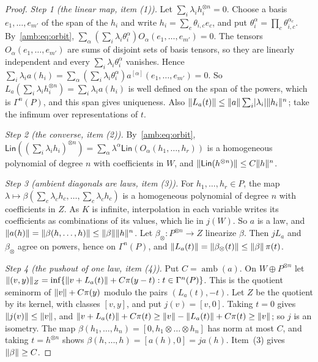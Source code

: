 \begin{proof}
\emph{Step 1 (the linear map, item (1)).} Let $\sum_i\lambda_ih_i^{\otimes n}=0$. Choose a basis $e_1,\dots,e_{m'}$ of the span of the $h_i$ and write $h_i=\sum_c\theta_{i,c}e_c$, and put $\theta_i^\alpha=\prod_c\theta_{i,c}^{\alpha_c}$. By~\eqref{amb:eq:orbit}, $\sum_\alpha(\sum_i\lambda_i\theta_i^\alpha)\allowbreak O_\alpha(e_1,\dots,e_{m'})=0$. The tensors $O_\alpha(e_1,\dots,e_{m'})$ are sums of disjoint sets of basis tensors, so they are linearly independent and every $\sum_i\lambda_i\theta_i^\alpha$ vanishes. Hence $\sum_i\lambda_ia(h_i)=\sum_\alpha(\sum_i\lambda_i\theta_i^\alpha)a^{[\alpha]}(e_1,\dots,e_{m'})=0$. So $L_a(\sum_i\lambda_ih_i^{\otimes n})=\sum_i\lambda_ia(h_i)$ is well defined on the span of the powers, which is $\Gamma^n(P)$, and this span gives uniqueness. Also $\lVert L_a(t)\rVert\le\lVert a\rVert\sum_i\lvert \lambda_i\rvert\lVert h_i\rVert^n$; take the infimum over representations of $t$.

\emph{Step 2 (the converse, item (2)).} By~\eqref{amb:eq:orbit}, $\mathsf{Lin}((\sum_i\lambda_ih_i)^{\otimes n})=\sum_\alpha\lambda^\alpha\mathsf{Lin}(O_\alpha(h_1,\dots,h_r))$ is a homogeneous polynomial of degree $n$ with coefficients in $W$, and $\lVert \mathsf{Lin}(h^{\otimes n})\rVert\le C\lVert h\rVert^n$.

\emph{Step 3 (ambient diagonals are laws, item (3)).} For $h_1,\dots,h_r\in P$, the map $\lambda\mapsto\beta(\sum_c\lambda_ch_c,\dots,\sum_c\lambda_ch_c)$ is a homogeneous polynomial of degree $n$ with coefficients in $Z$. As $K$ is infinite, interpolation in each variable writes its coefficients as combinations of its values, which lie in $j(W)$. So $a$ is a law, and $\lVert a(h)\rVert=\lVert \beta(h,\dots,h)\rVert\le\lVert \beta\rVert\lVert h\rVert^n$. Let $\beta_\otimes\colon P^{\otimes n}\to Z$ linearize $\beta$. Then $jL_a$ and $\beta_\otimes$ agree on powers, hence on $\Gamma^n(P)$, and $\lVert L_a(t)\rVert=\lVert \beta_\otimes(t)\rVert\le\lVert \beta\rVert\,\pi(t)$.

\emph{Step 4 (the pushout of one law, item (4)).} Put $C=\operatorname{amb}(a)$. On $W\oplus P^{\otimes n}$ let $\lVert (v,y)\rVert_Z=\inf\{\lVert v+L_a(t)\rVert+C\pi(y-t):t\in\Gamma^n(P)\}$. This is the quotient seminorm of $\lVert v\rVert+C\pi(y)$ modulo the pairs $(L_a(t),-t)$. Let $Z$ be the quotient by its kernel, with classes $[v,y]$, and put $j(v)=[v,0]$. Taking $t=0$ gives $\lVert j(v)\rVert\le\lVert v\rVert$, and $\lVert v+L_a(t)\rVert+C\pi(t)\ge\lVert v\rVert-\lVert L_a(t)\rVert+C\pi(t)\ge\lVert v\rVert$; so $j$ is an isometry. The map $\beta(h_1,\dots,h_n)=[0,h_1\otimes\dots\otimes h_n]$ has norm at most $C$, and taking $t=h^{\otimes n}$ shows $\beta(h,\dots,h)=[a(h),0]=ja(h)$. Item~(3) gives $\lVert \beta\rVert\ge C$.
\end{proof}

